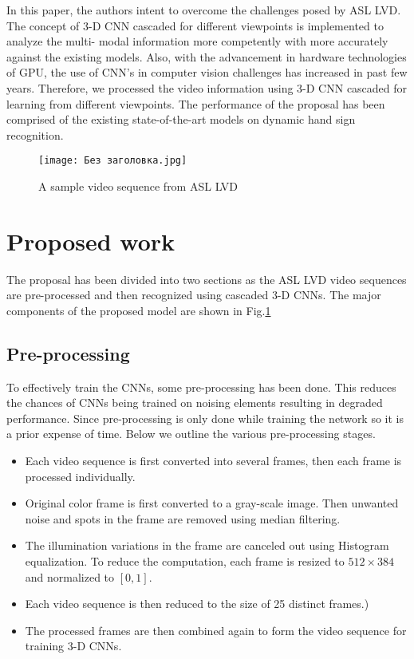\documentclass[
  manuscript=article,  %
  layout=preprint,  %
  year=20xx,
  volume=x,
]{joas}
\begin{document}
\par In this paper, the authors intent to overcome the challenges posed by ASL LVD. The concept of 3-D CNN cascaded for different viewpoints is implemented to analyze the multi- modal information more competently with more accurately against the existing models.
Also, with the advancement in hardware technologies of GPU, the use of CNN’s in computer vision challenges has increased in past few years. Therefore, we processed the video information using 3-D CNN cascaded for learning from different viewpoints. The performance of the proposal has been comprised of the existing state-of-the-art models on dynamic hand sign recognition.
\begin{figure}[h!]
    \centering
    \texttt{[image: Без заголовка.jpg]}
    \caption{A sample video sequence from ASL LVD}
    \label{f1}
\end{figure}







\section{Proposed work}\label{sec3}
The proposal has been divided into two sections as the ASL LVD video sequences are pre-processed and then recognized using cascaded 3-D CNNs. The major components of the proposed model are shown in Fig.\ref{f1}

\subsection{Pre-processing}\label{subsec2}
To effectively train the CNNs, some pre-processing has been done. This reduces the chances of CNNs being trained on noising elements resulting in degraded performance. Since pre-processing is only done while training the network so it is a prior expense of time. Below we outline the various pre-processing stages.


\begin{itemize}
  \item Each video sequence is first converted into several frames, then each frame is processed individually.
  \item Original color frame is first converted to a gray-scale image. Then unwanted noise and spots in the frame are removed using median filtering.
  \item The illumination variations in the frame are canceled out using Histogram equalization. To reduce the computation, each frame is resized to $512 \times 384$ and normalized to $[0, 1]$.
  \item Each video sequence is then reduced to the size of 25 distinct frames.)
  \item The processed frames are then combined again to form the video sequence for training 3-D CNNs.
\end{itemize}
\end{document}
